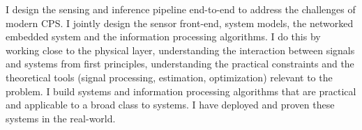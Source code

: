 \documentclass[10pt]{article}
\begin{document}
I design the sensing and inference pipeline end-to-end to address the challenges of modern CPS. I jointly design the sensor front-end, system models, the networked embedded system and the information processing algorithms. I do this by working close to the physical layer, understanding the interaction between signals and systems from first principles, understanding the practical constraints and the theoretical tools (signal processing, estimation, optimization) relevant to the problem. 
I build systems and information processing algorithms that are practical and applicable to a broad class to systems. I have deployed and proven these systems in the real-world.

\end{document}
